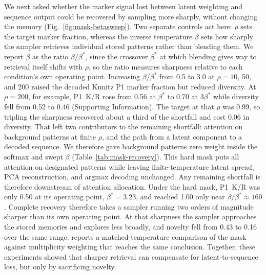 We next asked whether the marker signal lost between latent weighting and sequence output could
be recovered by sampling more sharply, without changing the memory
(Fig.~\ref{fig:mask-betasweep}). Two separate controls act
here: $\rho$ sets the target marker fraction, whereas the inverse temperature $\beta$ sets how
sharply the sampler retrieves individual stored patterns rather than blending them. We report
$\beta$ as the ratio $\beta/\beta^{*}$, since the crossover $\beta^{*}$ at which blending gives
way to retrieval itself shifts with $\rho$, so the ratio measures sharpness relative to each
condition's own operating point. Increasing $\beta/\beta^{*}$ from 0.5 to 3.0 at
$\rho=10$, 50, and 200 raised the decoded Kunitz P1 marker fraction but reduced diversity. At
$\rho=200$, for example, P1~K/R rose from 0.56 at $\beta^{*}$ to 0.70 at $3\beta^{*}$ while
diversity fell from 0.52 to 0.46 (Supporting Information). The target at that $\rho$ was 0.99,
so tripling the sharpness recovered about a third of the shortfall and cost 0.06 in diversity.
That left two contributors to the remaining shortfall: attention on background patterns at
finite $\rho$, and the path from a latent component to a decoded sequence. We therefore gave background patterns
zero weight inside the softmax and swept $\beta$ (Table~\ref{tab:mask-recovery}). This hard
mask puts all attention on designated patterns while leaving finite-temperature latent spread,
PCA reconstruction, and argmax decoding unchanged. Any remaining shortfall is therefore
downstream of attention allocation.
Under the hard mask, P1~K/R was only 0.50 at its operating point, $\beta^{*}=3.23$,
and reached 1.00 only near $\beta/\beta^{*}\approx160$. Complete recovery therefore takes a
sampler running two orders of magnitude sharper than its own operating point. At that sharpness
the sampler approaches the stored memories and explores less broadly,
and novelty fell from 0.43 to 0.16 over the same range.  reports a
matched-temperature comparison of the mask against multiplicity weighting that reaches the same
conclusion. Together, these experiments showed that
sharper retrieval can compensate for latent-to-sequence loss, but only by sacrificing novelty.

